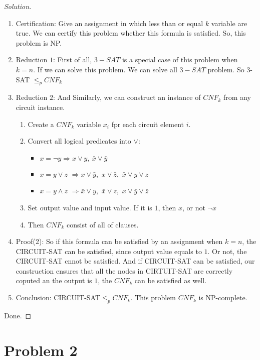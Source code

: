 \documentclass[a4paper]{article}
\newenvironment{solution}
  {\renewcommand\qedsymbol{$\blacksquare$}\begin{proof}[Solution]}
  {\end{proof}}
\begin{document}
\begin{solution}\
  \begin{enumerate}[(1)]
    \item Certification: Give an assignment in which less than or equal $k$ variable are true. We can certify this problem whether this formula is satisfied. So, this problem is NP.
    \item Reduction $1$: First of all, $3-SAT$ is a special case of this problem when $k=n$. If we can solve this problem. We can solve all $3-SAT$ problem. So $3$-SAT $\le_{p} CNF_{k}$
    \item Reduction $2$: And Similarly, we can construct an instance of $CNF_{k}$ from any circuit instance.
    \begin{enumerate}[Step 1:]
      \item Create a $CNF_{k}$ variable $x_{i}$ fpr each circuit element $i$.
      \item Convert all logical predicates into $\lor$:
      \begin{itemize}
        \item $x=\neg y$\quad $\Rightarrow$\quad $x\lor y,\  \bar{x}\lor \bar {y}$
        \item $x=y\lor z$ \quad $\Rightarrow$\quad  $x\lor \bar{y}$,\ $x\lor\bar{z}$,\ $\bar{x}\lor y \lor z$
        \item $x=y\land z$ \quad $\Rightarrow$\quad $\bar{x}\lor y$,\ $\bar{x}\lor z$,\ $x\lor \bar{y}\lor \bar{z}$
      \end{itemize}
      \item Set output value and input value. If it is $1$, then $x$, or not $\neg x$
      \item Then $CNF_{k}$ consist of all of clauses.
    \end{enumerate}
    \item Proof(2): So if  this formula can be satisfied by an assignment when $k=n$, the CIRCUIT-SAT can be satisfied, since output value equals to $1$. Or not, the CIRCUIT-SAT cnnot be satisfied. And if CIRCUIT-SAT can be satisfied, our construction ensures that all the nodes in CIRTUIT-SAT are correctly coputed an the output is $1$, the $CNF_{k}$ can be satisfied as well.
    \item Conclusion: CIRCUIT-SAT$\le_{p}CNF_{k}$. This problem $CNF_{k}$ is NP-complete.
  \end{enumerate}
  Done.
\end{solution}

\section*{Problem 2}
\end{document}
